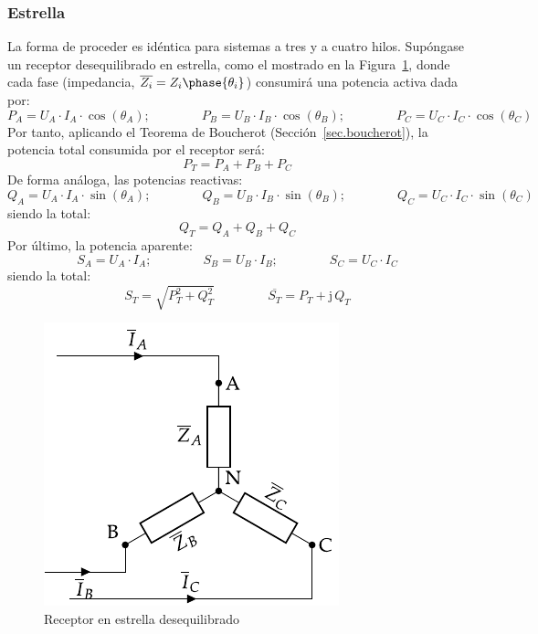 	\subsubsection{Estrella}
	La forma de proceder es idéntica para sistemas a tres y a cuatro hilos. Supóngase un receptor desequilibrado en estrella, como el mostrado en la Figura~\ref{fig.estrellaDesequilibrado_potencia}, donde cada fase (impedancia, $\overline{Z_i}=Z_i\phase{\theta_i}$) consumirá una potencia activa dada por: 
	\begin{equation*}
	    P_A=U_{A}\cdot I_A \cdot \cos(\theta_A);\qquad \qquad
	    P_B=U_{B}\cdot I_B \cdot \cos(\theta_B);\qquad \qquad
	    P_C=U_{C}\cdot I_C \cdot \cos(\theta_C)
	\end{equation*}
	Por tanto, aplicando el Teorema de Boucherot (Sección~\ref{sec.boucherot}), la potencia total consumida por el receptor será:
	\begin{equation}
	    \boxed{P_T=P_A+P_B+P_C}
	\end{equation}
	De forma análoga, las potencias reactivas:
	\begin{equation*}
	    Q_A=U_{A}\cdot I_A \cdot \sin(\theta_A);\qquad \qquad
	    Q_B=U_{B}\cdot I_B \cdot \sin(\theta_B);\qquad \qquad
	    Q_C=U_{C}\cdot I_C \cdot \sin(\theta_C)
	\end{equation*}
	siendo la total: 
	\begin{equation}
	    \boxed{Q_T=Q_A+Q_B+Q_C}
	\end{equation}
	Por último, la potencia aparente: 
	\begin{equation*}
	    S_A=U_{A}\cdot I_A;\qquad \qquad
	    S_B=U_{B}\cdot I_B;\qquad \qquad
	    S_C=U_{C}\cdot I_C
	\end{equation*}
	siendo la total: 
	\begin{equation}
	    \boxed{S_T=\sqrt{P_T^2+Q_T^2}}\,\qquad\qquad \boxed{\overline{S_T}=P_T+\mathrm{j}\,Q_T}
	\end{equation}
	
	\begin{figure}[H]
	    \centering
	    \includegraphics{../figs/EstrellaDesequilibrado_Receptor_SN.pdf}
	    \caption{Receptor en estrella desequilibrado}
	    \label{fig.estrellaDesequilibrado_potencia}
	\end{figure}
	
